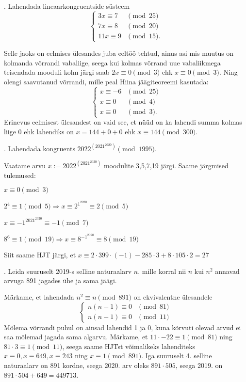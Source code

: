 \documentclass[a4paper, 10pt]{article}
\begin{document}
. Lahendada lineaarkongruentside s\"usteem 
$$
\left\{
\begin{array}{ll}
3x\equiv 7 & \pmod{25}\\
7x\equiv 8 & \pmod{20}\\
11x\equiv 9 & \pmod{15}.
\end{array}
\right.
$$

\bigskip
Selle jaoks on eelmises ülesandes juba eeltöö tehtud, ainus asi mis muutus on kolmanda võrrandi vabaliige, seega kui kolmas võrrand uue vabaliikmega teisendada mooduli kolm järgi saab $2x\equiv0\pmod3$ ehk $x\equiv0\pmod3$. Ning olengi saavutanud võrrandi, mille peal Hiina jäägiteoreemi kasutada:
\[
\left\{
\begin{array}{ll}
x\equiv -6 & \pmod{25}\\
x\equiv 0 & \pmod{4}\\
x\equiv 0 & \pmod{3}.
\end{array}
\right.
\]
Erinevus eelmisest ülesandest on vaid see, et nüüd on ka lahendi summa kolmas liige 0 ehk lahendiks on $x=144+0+0$ ehk $x\equiv144\pmod{300}$.
\bigskip

\pagebreak

. Lahendada kongruents $2022^{\left(2021^{2020}\right)} \pmod{1995}$.

\bigskip
Vaatame arvu $x:=2022^{\left(2021^{2020}\right)}$ moodulite 3,5,7,19 järgi. Saame järgmised tulemused:

$x\equiv 0 \pmod{3}$

$2^4 \equiv 1 \pmod{5}\Rightarrow x\equiv 2^{1^{2020}}\equiv 2 \pmod{5}$

$x\equiv -1^{2021^{2020}}\equiv -1 \pmod{7}$

$8^6 \equiv 1 \pmod{19} \Rightarrow x\equiv 8^{-1^{2020}}\equiv 8 \pmod{19}$

Siit saame HJT järgi, et $x \equiv 2\cdot399\cdot (-1) -285\cdot3+8\cdot105\cdot2=27$
\bigskip

. Leida suuruselt 2019-s selline naturaalarv $n$, mille korral nii $n$ kui $n^2$ annavad arvuga 891 jagades ühe ja sama jäägi. 

\bigskip
Märkame, et lahendada $n^2\equiv n \pmod{891}$ on ekvivalentne ülesandele
\[
\left\{
\begin{array}{ll}
n(n-1)\equiv 0 & \pmod{81}\\
n(n-1)\equiv 0 & \pmod{11}\
\end{array}
\right.
\]
Mõlema võrrandi puhul on ainsad lahendid 1 ja 0, kuna kõrvuti olevad arvud ei saa mõlemad jagada sama algarvu.
Märkame, et $11\cdot -22\equiv 1 \pmod {81}$ ning $81\cdot 3 \equiv 1 \pmod{11}$, seega saame HJTst võimalikeks lahenditeks $x\equiv 0, x\equiv 649, x\equiv 243$ ning $x\equiv 1 \pmod{891}$. Iga suuruselt 4. selline naturaalarv on 891 kordne, seega 2020. arv oleks $891\cdot 505$, seega 2019. on $891\cdot 504+649=449713$.
\bigskip
\end{document}
